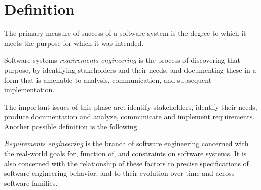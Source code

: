 \documentclass[12pt, a4paper]{report}
\begin{document}
    \section{Definition}
    The primary measure of success of a software system is the degree to which it meets the purpose for which it was intended.
    \begin{definition}
        Software systems \emph{requirements engineering} is the process of discovering that purpose, by identifying stakeholders and their needs, and documenting these in a form that 
        is amenable to analysis, communication, and subsequent implementation. 
    \end{definition}
    The important issues of this phase are: identify stakeholders, identify their needs, produce documentation and analyze, communicate and implement requirements. Another possible 
    definition is the following. 
    \begin{definition}
        \emph{Requirements engineering} is the branch of software engineering concerned with the real-world goals for, function of, and constraints on software systems. It is also 
        concerned with the relationship of these factors to precise specifications of software engineering behavior, and to their evolution over time and across software families. 
    \end{definition}
\end{document}
